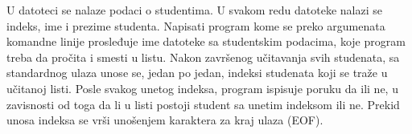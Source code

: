 \begin{Exercise}[label=609]
U datoteci se nalaze podaci o studentima. U svakom redu datoteke nalazi se indeks, ime i prezime studenta. 
Napisati program kome se preko argumenata komandne linije prosleđuje ime datoteke sa studentskim podacima, koje program treba da pročita i smesti u listu. 
Nakon završenog učitavanja svih studenata, sa standardnog ulaza unose se, jedan po jedan, indeksi studenata koji se traže u učitanoj listi. 
Posle svakog unetog indeksa, program ispisuje poruku da ili ne, u zavisnosti od toga da li u listi postoji student sa unetim indeksom ili ne. 
Prekid unosa indeksa se vrši unošenjem karaktera za kraj ulaza (EOF).


\end{Exercise}
